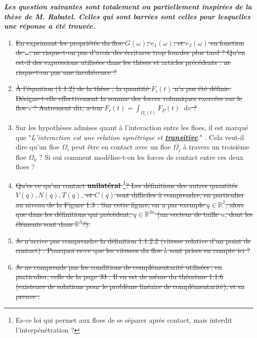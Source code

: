 \documentclass[
  french,
	11pt, %
]{fphw}
\newcommand*\diff{\mathop{}\!\mathrm{d}}
\begin{document}
\textbf{\textit{Les question suivantes sont totalement ou partiellement inspirées de la thèse de M. Rabatel. Celles qui sont barrées sont celles pour lesquelles une réponse a été trouvée.}}

\begin{enumerate}
  \item \sout{En exprimant les propriétés du floe $G(\omega)$, $e_1(\omega)$, et $e_2(\omega)$ en fonction de $\omega$, ne risque-t-on pas d'avoir des écritures trop lourdes plus tard ? Qu'en est-il des expressions utilisées dans les thèses et articles précédents : ne risque-t-on pas une incohérence ?}

  \item \sout{À l'équation (1.1.2) de la thèse \parencite[p.16]{rabatel2015thesis}, la quantité $F_i(t)$ n'a pas été définie. Désigne-t-elle effectivement la somme des forces volumiques exercées sur le floe $i$ ? Autrement dit, a-ton $F_i(t) = \int_{\Omega_i(t)} F_P(t) \diff v$ ?}

  \item Sur les hypothèses admises quant à l'interaction entre les floes, il est marqué que "\textit{L’interaction est une relation symétrique et \underline{\textbf{transitive}}.}" \parencite[p.18]{rabatel2015thesis}. Cela veut-il dire qu'un floe $\Omega_i$ peut être en contact avec un floe $\Omega_j$ à travers un troisième floe $\Omega_k$ ? Si oui comment modélise-t-on les forces de contact entre ces deux floes ?

  \item \sout{Qu'es ce qu'un contact \textbf{unilatéral} \parencite[p.20]{rabatel2015thesis}} \footnote{Es-ce loi qui permet aux floes de se séparer après contact, mais interdit l’interpénétration \parencite[p.32]{rabatel2015thesis}?}\sout{? Les définitions des autres quantités $V(q), N(q), T(q),$ et $C(q)$ sont difficiles à comprendre, en particulier au niveau de la Figure 1.3 \Parencite[P.22]{rabatel2015thesis}. Sur cette figure, on a par exemple $q \in \mathbb{R}^2$, alors que dans les définitions qui précèdent, $q \in \mathbb{R}^{3n}$ (un vecteur de taille $n$, dont les éléments sont dans $\mathbb{R}^3$?).}

  \item \sout{Je n'arrive pas comprendre la définition 1.1.2.2 (vitesse relative d’un point de contact) \parencite[p.26]{rabatel2015thesis}. Pourquoi es-ce que les vitesses du floe $k$ sont prises en compte ici ?}

  \item \sout{Je ne comprends pas les conditions de complémentarité utilisées ; en particulier, celle de la page 33 \parencite[p.33]{rabatel2015thesis}. Il en est de même du théorème 1.1.6 (existence de solutions pour le problème linéaire de complémentarité), et sa preuve \parencite[p.36]{rabatel2015thesis}.}


\end{enumerate}
\end{document}
